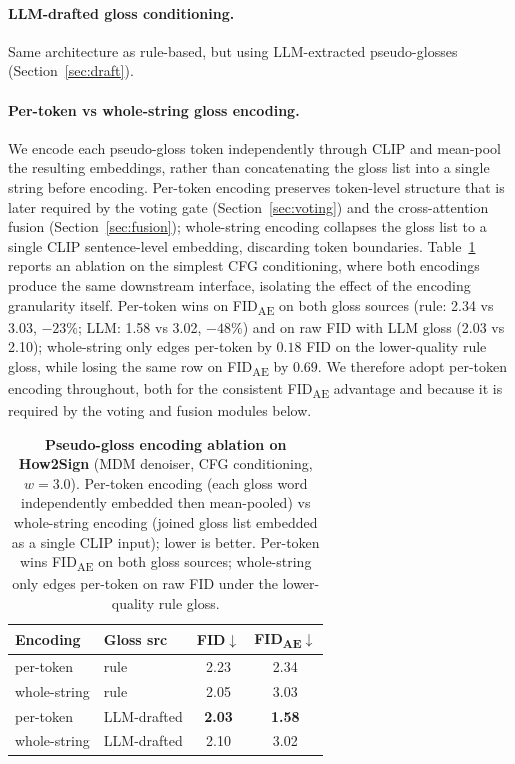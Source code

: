 \documentclass{article}
\begin{document}
\paragraph{LLM-drafted gloss conditioning.}
Same architecture as rule-based, but using LLM-extracted pseudo-glosses (Section~\ref{sec:draft}).

\paragraph{Per-token vs whole-string gloss encoding.}
We encode each pseudo-gloss token independently through CLIP and mean-pool the resulting embeddings, rather than concatenating the gloss list into a single string before encoding.
Per-token encoding preserves token-level structure that is later required by the voting gate (Section~\ref{sec:voting}) and the cross-attention fusion (Section~\ref{sec:fusion}); whole-string encoding collapses the gloss list to a single CLIP sentence-level embedding, discarding token boundaries.
Table~\ref{tab:gloss_encoding_ablation} reports an ablation on the simplest CFG conditioning, where both encodings produce the same downstream interface, isolating the effect of the encoding granularity itself. Per-token wins on FID\textsubscript{AE} on both gloss sources (rule: 2.34 vs 3.03, $-23\%$; LLM: 1.58 vs 3.02, $-48\%$) and on raw FID with LLM gloss (2.03 vs 2.10); whole-string only edges per-token by $0.18$ FID on the lower-quality rule gloss, while losing the same row on FID\textsubscript{AE} by $0.69$. We therefore adopt per-token encoding throughout, both for the consistent FID\textsubscript{AE} advantage and because it is required by the voting and fusion modules below.

\begin{table}[h]
  \caption{\textbf{Pseudo-gloss encoding ablation on How2Sign} (MDM denoiser, CFG conditioning, $w=3.0$). Per-token encoding (each gloss word independently embedded then mean-pooled) vs whole-string encoding (joined gloss list embedded as a single CLIP input); lower is better. Per-token wins FID\textsubscript{AE} on both gloss sources; whole-string only edges per-token on raw FID under the lower-quality rule gloss.}
  \label{tab:gloss_encoding_ablation}
  \centering
  \small
  \begin{tabular}{llcc}
    \toprule
    \textbf{Encoding} & \textbf{Gloss src} & \textbf{FID}$\downarrow$ & \textbf{FID\textsubscript{AE}}$\downarrow$ \\
    \midrule
    per-token    & rule        & 2.23          & 2.34          \\
    whole-string & rule        & 2.05          & 3.03          \\
    per-token    & LLM-drafted & \textbf{2.03} & \textbf{1.58} \\
    whole-string & LLM-drafted & 2.10          & 3.02          \\
    \bottomrule
  \end{tabular}
\end{table}
\end{document}
